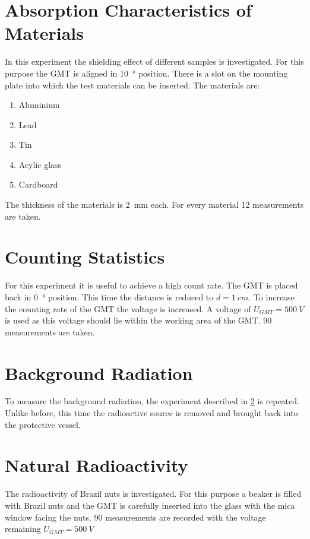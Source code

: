 \section{Absorption Characteristics of Materials}
In this experiment the shielding effect of different samples is investigated. For this purpose the GMT is aligned in
\SI[]{10}[]{\degree} position. There is a slot on the mounting plate into which the test materials can be inserted. The
materials are:
\begin{enumerate}
	\item Aluminium
	\item Lead
	\item Tin
	\item Acylic glass
	\item Cardboard
\end{enumerate}
The thickness of the materials is \SI[]{2}[]{mm} each. For every material 12 measurements are taken. %
%
\section{Counting Statistics} \label{sec:count_stat}
For this experiment it is useful to achieve a high count rate. The GMT is placed back in \SI[]{0}[]{\degree} position.
This time the distance is reduced to \(d = \SI[]{1}[]{cm}\). To increase the counting rate of the GMT the voltage is
increased. A voltage of \(U_{GMT} = \SI[]{500}[]{V}\) is used as this voltage should lie within the working area of the
GMT. 90 measurements are taken.
%
\section{Background Radiation}
To measure the background radiation, the experiment described in \cref{sec:count_stat} is repeated. Unlike
before, this time the radioactive source is removed and brought back into the protective vessel.
%
\section{Natural Radioactivity}
%
The radioactivity of Brazil nuts is investigated. For this purpose a beaker is filled with Brazil nuts and the
GMT is carefully inserted into the glass with the mica window facing the nuts. 90 measurements are recorded with the
voltage remaining \(U_{GMT} = \SI[]{500}[]{V}\) %